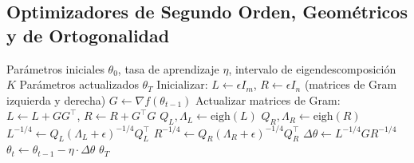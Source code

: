 \documentclass[11pt,a4paper]{article}
\begin{document}
\subsection{Optimizadores de Segundo Orden, Geométricos y de Ortogonalidad}

\begin{algorithm}[H]
\caption{Shampoo (Precondicionamiento Matricial mediante Productos de Kronecker)}
\label{alg:shampoo}
\begin{algorithmic}[1]
\Require Parámetros iniciales $\theta_0$, tasa de aprendizaje $\eta$, intervalo de eigendescomposición $K$
\Ensure Parámetros actualizados $\theta_T$
\State Inicializar: $L \gets \epsilon I_m$, $R \gets \epsilon I_n$ (matrices de Gram izquierda y derecha)
    \State $G \gets \nabla f(\theta_{t-1})$ 
    \State Actualizar matrices de Gram: $L \gets L + G G^\top$, $R \gets R + G^\top G$
        \State $Q_L, \Lambda_L \gets \text{eigh}(L)$ 
        \State $Q_R, \Lambda_R \gets \text{eigh}(R)$ 
        \State $L^{-1/4} \gets Q_L (\Lambda_L + \epsilon)^{-1/4} Q_L^\top$
        \State $R^{-1/4} \gets Q_R (\Lambda_R + \epsilon)^{-1/4} Q_R^\top$
    \EndIf
    \State $\Delta \theta \gets L^{-1/4} G R^{-1/4}$ 
    \State $\theta_t \gets \theta_{t-1} - \eta \cdot \Delta \theta$
\EndFor
\Return $\theta_T$
\end{algorithmic}
\end{algorithm}
\end{document}
